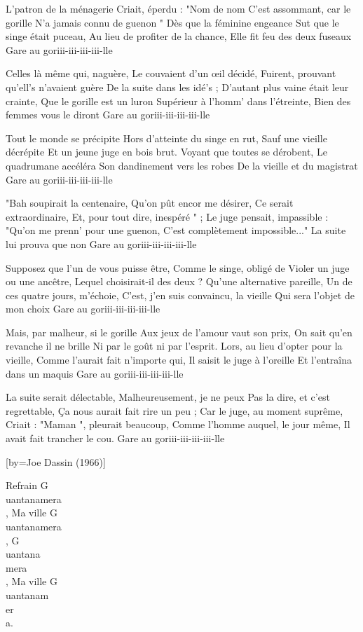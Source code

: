 \beginverse
L'patron de la ménagerie
Criait, éperdu : "Nom de nom \!
C'est assommant, car le gorille
N'a jamais connu de guenon \!"
Dès que la féminine engeance
Sut que le singe était puceau,
Au lieu de profiter de la chance,
Elle fit feu des deux fuseaux \!
Gare au goriii-iii-iii-iii-lle \!
\endverse

\beginverse
Celles là même qui, naguère,
Le couvaient d'un œil décidé,
Fuirent, prouvant qu'ell’s n'avaient guère
De la suite dans les idé’s ;
D'autant plus vaine était leur crainte,
Que le gorille est un luron
Supérieur à l'homm’ dans l'étreinte,
Bien des femmes vous le diront \!
Gare au goriii-iii-iii-iii-lle \!
\endverse

\beginverse
Tout le monde se précipite
Hors d'atteinte du singe en rut,
Sauf une vieille décrépite
Et un jeune juge en bois brut.
Voyant que toutes se dérobent,
Le quadrumane accéléra
Son dandinement vers les robes
De la vieille et du magistrat \!
Gare au goriii-iii-iii-iii-lle \!
\endverse

"Bah \! soupirait la centenaire,
Qu'on pût encor me désirer,
Ce serait extraordinaire,
Et, pour tout dire, inespéré \!" ;
Le juge pensait, impassible :
"Qu'on me prenn’ pour une guenon,
C'est complètement impossible..."
La suite lui prouva que non \!
Gare au goriii-iii-iii-iii-lle \!

\beginverse
Supposez que l'un de vous puisse être,
Comme le singe, obligé de
Violer un juge ou une ancêtre,
Lequel choisirait-il des deux ?
Qu'une alternative pareille,
Un de ces quatre jours, m'échoie,
C'est, j'en suis convaincu, la vieille
Qui sera l'objet de mon choix \!
Gare au goriii-iii-iii-iii-lle \!
\endverse

\beginverse
Mais, par malheur, si le gorille
Aux jeux de l'amour vaut son prix,
On sait qu'en revanche il ne brille
Ni par le goût ni par l'esprit.
Lors, au lieu d'opter pour la vieille,
Comme l'aurait fait n'importe qui,
Il saisit le juge à l'oreille
Et l'entraîna dans un maquis \!
Gare au goriii-iii-iii-iii-lle \!
\endverse

\beginverse
La suite serait délectable,
Malheureusement, je ne peux
Pas la dire, et c'est regrettable,
Ça nous aurait fait rire un peu ;
Car le juge, au moment suprême,
Criait : "Maman \!", pleurait beaucoup,
Comme l'homme auquel, le jour même,
Il avait fait trancher le cou.
Gare au goriii-iii-iii-iii-lle \!
\endverse

[by={Joe Dassin (1966)}]

\beginverse
Refrain
G\\[Sol]uantanamera\\[La],
Ma ville G\\[Ré]uantanamera\\[La],
G\\[Ré]uantana\\[Sol]mera\\[La],
Ma ville G\\[Ré]uantanam\\[Sol]er\\[La]a.
\endverse

